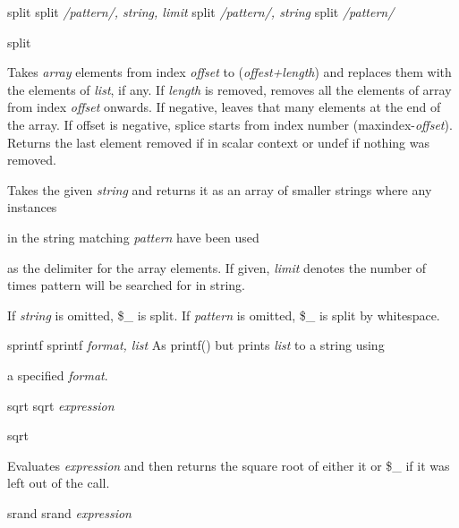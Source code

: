 \documentclass[a4paper,11pt]{book}
\begin{document}
\noindent 

\noindent 

\noindent split split \textit{/pattern/, string, limit }split \textit{/pattern/, string }split \textit{/pattern/}

\noindent split

\noindent 

\noindent Takes \textit{array }elements from index \textit{offset }to (\textit{offest+length}) and replaces them with the elements of \textit{list}, if any. If \textit{length }is removed, removes all the elements of array from index \textit{offset }onwards. If negative, leaves that many elements at the end of the array. If offset is negative, splice starts from index number (maxindex-\textit{offset}). Returns the last element removed if in scalar context or undef if nothing was removed.

\noindent 

\noindent Takes the given \textit{string }and returns it as an array of smaller strings where any instances

\noindent in the string matching \textit{pattern }have been used

\noindent as the delimiter for the array elements. If given, \textit{limit }denotes the number of times pattern will be searched for in string.

\noindent 

\noindent If \textit{string }is omitted, \$\_ is split. If \textit{pattern }is omitted, \$\_ is split by whitespace.

\noindent 

\noindent 

\noindent sprintf sprintf \textit{format, list }As printf() but prints \textit{list }to a string using

\noindent a specified \textit{format}.

\noindent 

\noindent 

\noindent 

\noindent sqrt sqrt \textit{expression}

\noindent 

\noindent sqrt

\noindent Evaluates \textit{expression }and then returns the square root of either it or \$\_ if it was left out of the call.

\noindent 

\noindent 

\noindent 

\noindent srand srand \textit{expression}
\end{document}
